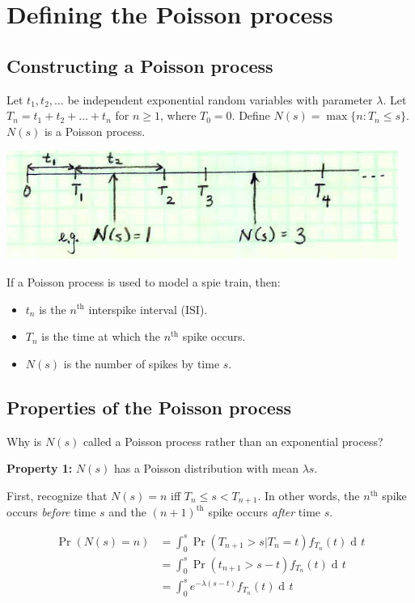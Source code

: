 \documentclass[11pt]{article}
\DeclareMathOperator{\dif}{d\!}
\newenvironment{propertybox}{%
   \def\FrameCommand{\colorbox{LightSteelBlue}}%
   \MakeFramed{\advance\hsize-\width \FrameRestore}}
 {\endMakeFramed}
\begin{document}
\section{Defining the Poisson process}
\subsection{Constructing a Poisson process}
Let $t_1, t_2, \ldots$ be independent exponential random variables with parameter $\lambda$. Let
$T_n = t_1 + t_2 + \ldots + t_n$ for $n \geq 1$, where $T_0 = 0$. Define $N(s) = \max \lbrace n : T_n \leq s\rbrace$. $N(s)$ is a Poisson process.

\begin{center}
\includegraphics[scale=0.5]{Figure3.jpg}
\end{center}

If a Poisson process is used to model a spie train, then:
\begin{itemize}
\item $t_n$ is the $n^{\text{th}}$ interspike interval (ISI).
\item $T_n$ is the time at which the $n^{\text{th}}$ spike occurs.
\item $N(s)$ is the number of spikes by time $s$.
\end{itemize}


\subsection{Properties of the Poisson process}
Why is $N(s)$ called a Poisson process rather than an exponential process?

\begin{propertybox}
{\bf Property 1:} $N(s)$ has a Poisson distribution with mean $\lambda s$.
\end{propertybox}

First, recognize that $N(s)=n$ iff $T_n \leq s < T_{n+1}$. In other words, the $n^{\text{th}}$ spike
occurs \emph{before} time $s$ and the $(n+1)^{\text{th}}$ spike occurs \emph{after} time $s$.

\begin{equation*}
\begin{split}
\Pr\left(N(s) = n\right) &= \int_0^s \Pr\left(T_{n+1} > s \vert T_n = t\right) f_{T_n}(t) \dif t \\
  &= \int_0^s \Pr\left(t_{n+1} > s-t\right) f_{T_n}(t) \dif t \\
  &= \int_0^s e^{-\lambda (s - t)} f_{T_n}(t) \dif t
\end{split}
\end{equation*}
\end{document}
